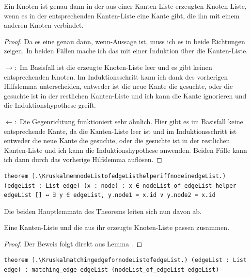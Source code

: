 \begin{lemma}[\KruskalmemnodeListofedgeListhelperiffnodeinedgeList]\label{KruskalmemnodeListofedgeListhelperiffnodeinedgeList}
  Ein Knoten ist genau dann in der aus einer Kanten-Liste erzeugten Knoten-Liste, wenn es in der entsprechenden Kanten-Liste eine Kante gibt, die ihn mit einem anderen Knoten verbindet.
\end{lemma}
\begin{proof}
  Da es eine \glqq genau dann, wenn\grqq -Aussage ist, muss ich es in beide Richtungen zeigen.
  In beiden Fällen mache ich das mit einer Induktion über die Kanten-Liste.

  $\rightarrow:$
  Im Basisfall ist die erzeugte Knoten-Liste leer und es gibt keinen entsprechenden Knoten.
  Im Induktionsschritt kann ich dank des vorherigen Hilfslemma unterscheiden, entweder ist die neue Kante die gesuchte, oder die gesuchte ist in der restlichen Kanten-Liste
  und ich kann die Kante ignorieren und die Induktionshypothese greift.

  $\leftarrow:$
  Die Gegenrichtung funktioniert sehr ähnlich.
  Hier gibt es im Basisfall keine entsprechende Kante, da die Kanten-Liste leer ist
  und im Induktionsschritt ist entweder die neue Kante die gesuchte, oder die gesuchte ist in der restlichen Kanten-Liste und ich kann die Induktionshypothese anwenden.
  Beiden Fälle kann ich dann durch das vorherige Hilfslemma auflösen.
\end{proof}
\begin{lstlisting}
theorem (.\KruskalmemnodeListofedgeListhelperiffnodeinedgeList.) (edgeList : List edge) (x : node) : x ∈ nodeList_of_edgeList_helper edgeList [] ↔ ∃ y ∈ edgeList, y.node1 = x.id ∨ y.node2 = x.id
\end{lstlisting}

Die beiden Hauptlemmata des Theorems leiten sich nun davon ab.

\begin{lemma}[\KruskalmatchingedgefornodeListofedgeList]
  Eine Kanten-Liste und die aus ihr erzeugte Knoten-Liste passen zusammen.
\end{lemma}
\begin{proof}
  Der Beweis folgt direkt aus Lemma \KruskalmemnodeListofedgeListhelperiffnodeinedgeList.
\end{proof}
\begin{lstlisting}
theorem (.\KruskalmatchingedgefornodeListofedgeList.) (edgeList : List edge) : matching_edge edgeList (nodeList_of_edgeList edgeList)
\end{lstlisting}



